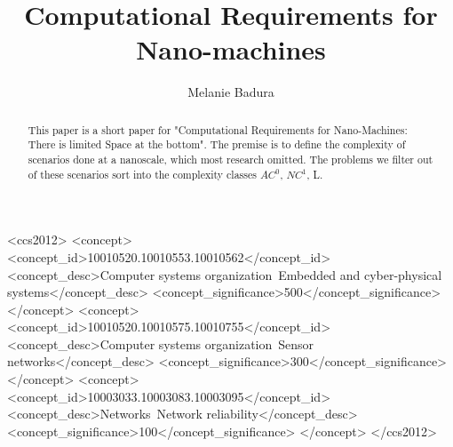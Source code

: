 \documentclass[10pt,sigconf]{acmart}
\begin{document}
\title{Computational Requirements for Nano-machines}

\author{Melanie Badura}




\renewcommand{\shortauthors}{M. Badura et al.}


\begin{abstract}
This paper is a short paper for "Computational Requirements for 
Nano-Machines: There is limited Space at the bottom"\cite{lau2017computational}.
The premise is to define the complexity of scenarios done at a nanoscale, which most research omitted.
The problems we filter out of these scenarios sort into the complexity classes $AC^0$, $NC^1$, L.
\end{abstract}

%
%
\begin{CCSXML}
<ccs2012>
 <concept>
  <concept_id>10010520.10010553.10010562</concept_id>
  <concept_desc>Computer systems organization~Embedded and cyber-physical systems</concept_desc>
  <concept_significance>500</concept_significance>
 </concept>
 <concept>
  <concept_id>10010520.10010575.10010755</concept_id>
  <concept_desc>Computer systems organization~Sensor networks</concept_desc>
  <concept_significance>300</concept_significance>
 </concept>
 <concept>
  <concept_id>10003033.10003083.10003095</concept_id>
  <concept_desc>Networks~Network reliability</concept_desc>
  <concept_significance>100</concept_significance>
 </concept>
</ccs2012>  
\end{CCSXML}






\maketitle
\end{document}

